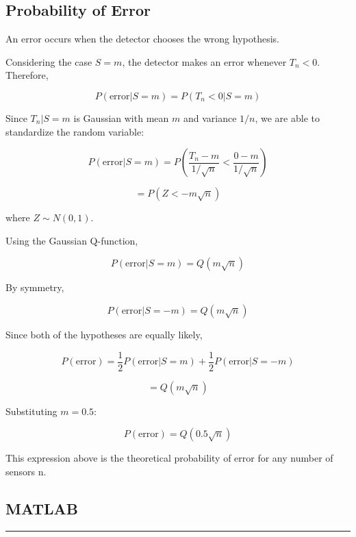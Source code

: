 \documentclass[12pt,a4paper]{article}
\begin{document}
\subsection{Probability of Error}

An error occurs when the detector chooses the wrong hypothesis.

Considering the case \(S=m\), the detector makes an error whenever \(T_n<0\). Therefore,

\[
P(\text{error}|S=m)
=
P(T_n<0|S=m)
\]

Since \(T_n|S=m\) is Gaussian with mean \(m\) and variance \(1/n\), we are able to standardize the random variable:

\[
P(\text{error}|S=m)
=
P\left(
\frac{T_n-m}{1/\sqrt{n}}
<
\frac{0-m}{1/\sqrt{n}}
\right)
\]

\[
=
P(Z<-m\sqrt{n})
\]

where \(Z\sim N(0,1)\).

Using the Gaussian Q-function,

\[
P(\text{error}|S=m)=Q(m\sqrt{n})
\]

By symmetry,

\[
P(\text{error}|S=-m)=Q(m\sqrt{n})
\]

Since both of the hypotheses are equally likely, 

\[
P(\text{error})
=
\frac{1}{2}P(\text{error}|S=m)
+
\frac{1}{2}P(\text{error}|S=-m)
\]

\[
=
Q(m\sqrt{n})
\]

Substituting \(m=0.5\):

\[
P(\text{error})
=
Q(0.5\sqrt{n})
\]

This expression above is the theoretical probability of error for any number of sensors n.

\subsection{MATLAB}

\hrule
\end{document}
